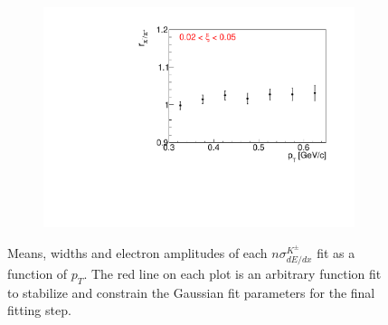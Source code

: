 \begin{figure}[h!]
\begin{subfigure}{.32\textwidth}
		\includegraphics[width=\linewidth, page=12]{chapters/chrgSTAR/img/dEdx/fit2019_fitResult_1_0_step_0.pdf}
	\end{subfigure}
		\caption[Means, widths and electron amplitudes of each $n\sigma^{K^\pm}_{dE/dx}$ fit as a function of $p_T$.]{Means, widths and electron amplitudes of each $n\sigma^{K^\pm}_{dE/dx}$ fit as a function of $p_T$.  The red line on each plot is an arbitrary function fit to stabilize and constrain the Gaussian fit parameters for the final fitting step.}
		\label{fig:dEdx_fit_parametersK}
\end{figure}

